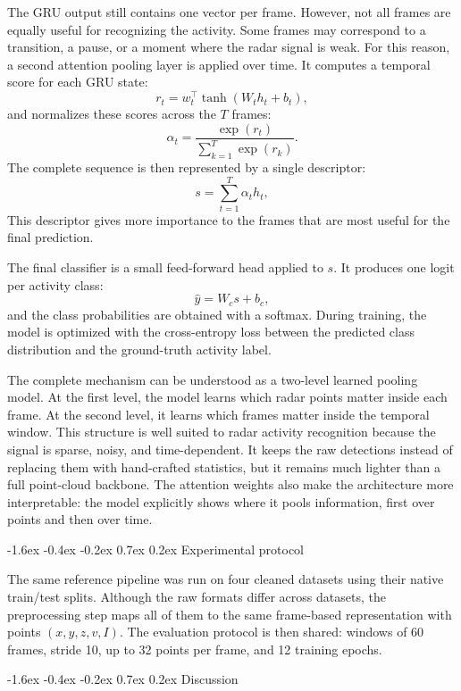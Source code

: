 \documentclass[10pt,twocolumn]{article}
\makeatletter
\renewcommand{\subsection}{%
  \@startsection{subsection}{2}{\z@}%
  {-1.6ex \@plus -0.4ex \@minus -0.2ex}%
  {0.7ex \@plus 0.2ex}%
  {\normalfont\normalsize\bfseries}}
\makeatother
\begin{document}
The GRU output still contains one vector per frame. However, not all frames are
equally useful for recognizing the activity. Some frames may correspond to a
transition, a pause, or a moment where the radar signal is weak. For this
reason, a second attention pooling layer is applied over time. It computes a
temporal score for each GRU state:
\[
    r_t = w_t^\top \tanh(W_t h_t + b_t),
\]
and normalizes these scores across the $T$ frames:
\[
    \alpha_t =
    \frac{\exp(r_t)}{\sum_{k=1}^{T} \exp(r_k)}.
\]
The complete sequence is then represented by a single descriptor:
\[
    s = \sum_{t=1}^{T} \alpha_t h_t,
\]
This descriptor gives more importance to the frames that are most useful for the
final prediction.

The final classifier is a small feed-forward head applied to $s$. It produces
one logit per activity class:
\[
    \hat{y} = W_c s + b_c,
\]
and the class probabilities are obtained with a softmax. During training, the
model is optimized with the cross-entropy loss between the predicted class
distribution and the ground-truth activity label.

The complete mechanism can be understood as a two-level learned pooling model.
At the first level, the model learns which radar points matter inside each
frame. At the second level, it learns which frames matter inside the temporal
window. This structure is well suited to radar activity recognition because the
signal is sparse, noisy, and time-dependent. It keeps the raw detections instead
of replacing them with hand-crafted statistics, but it remains much lighter than
a full point-cloud backbone. The attention weights also make the architecture
more interpretable: the model explicitly shows where it pools information, first
over points and then over time.

\subsection{Experimental protocol}

The same reference pipeline was run on four cleaned datasets using their native
train/test splits. Although the raw formats differ across datasets, the
preprocessing step maps all of them to the same frame-based representation with
points $(x,y,z,v,I)$. The evaluation protocol is then shared: windows of 60
frames, stride 10, up to 32 points per frame, and 12 training epochs.

\subsection{Discussion}
\end{document}
